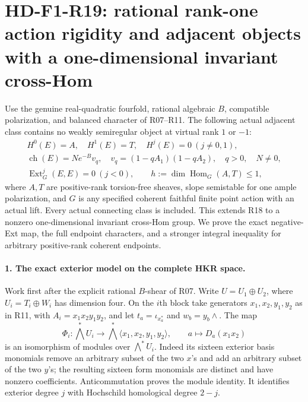 \section[HD-F1-R19: rational rank-one action rigidity]{HD-F1-R19: rational rank-one action rigidity and adjacent objects with a one-dimensional invariant cross-Hom}
\label{sec:followup-rm-rank-one-action}

Use the genuine real-quadratic fourfold, rational algebraic
$B$, compatible polarization, and balanced character of
R07--R11. The following actual adjacent class contains no
weakly semiregular object at virtual rank $1$ or $-1$:
\[
 \begin{gathered}
 H^0(E)=A,\quad H^1(E)=T,\quad H^j(E)=0\ (j\ne0,1),\\
 \operatorname{ch}(E)=N e^{-B}v_q,\quad
 v_q=(1-qA_1)(1-qA_2),\quad q>0,\quad N\ne0,\\
 \operatorname{Ext}^{j}_G(E,E)=0\ (j<0),\qquad
 h:=\dim\operatorname{Hom}_G(A,T)\le1,
 \end{gathered}
 \tag{F1R19.1}
\]
where $A,T$ are positive-rank torsion-free sheaves,
slope semistable for one ample polarization, and $G$
is any specified coherent faithful finite point action
with an actual lift. Every actual connecting class is
included. This extends R18 to a nonzero one-dimensional
invariant cross-Hom group. We prove the exact negative-Ext
map, the full endpoint characters, and a stronger integral
inequality for arbitrary positive-rank coherent endpoints.

\paragraph{1. The exact exterior model on the complete HKR space.}
Work first after the explicit rational $B$-shear of R07.
Write $U=U_1\oplus U_2$, where
$U_i=T_i\oplus W_i$ has dimension four. On the $i$th
block take generators $x_1,x_2,y_1,y_2$ as in R11,
with $A_i=x_1x_2y_1y_2$, and let
$t_a=\iota_{x_a^*}$ and $w_b=y_b\wedge$. The map
\[
 \Phi_i:\bigwedge^*U_i\longrightarrow
    \bigwedge^*\langle x_1,x_2,y_1,y_2\rangle,
       \qquad a\longmapsto D_a(x_1x_2)
 \tag{F1R19.2}
\]
is an isomorphism of modules over $\bigwedge^*U_i$.
Indeed its sixteen exterior basis monomials remove
an arbitrary subset of the two $x$'s and add an
arbitrary subset of the two $y$'s; the resulting
sixteen form monomials are distinct and have nonzero
coefficients. Anticommutation proves the module
identity. It identifies exterior degree $j$ with
Hochschild homological degree $2-j$.

